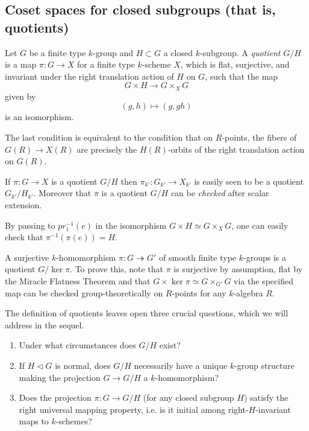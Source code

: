 \documentclass[10pt]{article}
\newcommand{\nsg}{\vartriangleleft}
\renewcommand{\(}{\left(}
\renewcommand{\)}{\right)}
\newcommand{\onto}{\twoheadrightarrow }
\newcommand{\dtimes}{\displaystyle\mathop{\times}}
\numberwithin{thm}{subsection}
\begin{document}
\subsection{Coset spaces for closed subgroups (that is, quotients)}
\begin{defn}
Let $G$ be a finite type $k$-group
and $H\subset G$ a closed $k$-subgroup.
A \textit{quotient} $G/H$ is a map
$\pi:G\to X$ for a finite type $k$-scheme $X$,
which is flat, surjective, and invariant under the right translation action of $H$ on $G$,
such that the map
\[G\times H\to G\dtimes_X G\]
given by
\[(g,h)\mapsto (g,gh)\]
is an isomorphism.
\end{defn}
\begin{rem}
The last condition is equivalent to the condition
that on $R$-points, the fibers of $G(R)\to X(R)$ are
precisely the $H(R)$-orbits of the right translation action
on $G(R)$.
\end{rem}
\begin{rem}
If $\pi:G\to X$ is a quotient $G/H$
then $\pi_{k'}:G_{k'}\to X_{k'}$ is easily seen to be a quotient $G_{k'}/H_{k'}$.
Moreover that $\pi$ is a quotient $G/H$ can be \textit{checked}
after scalar extension.
\end{rem}
\begin{rem}
By passing to $pr_1^{-1}(e)$ in the isomorphism $G\times H\simeq G\dtimes_X G$,
one can easily check
that $\pi^{-1}(\pi(e))=H$.
\end{rem}
\begin{ex}
A surjective $k$-homomorphism $\pi:G\onto G'$
of smooth finite type $k$-groups
is a quotient $G/\ker \pi$.
To prove this, note that $\pi$ is surjective by assumption,
flat by the Miracle Flatness Theorem \cite[23.1]{crt} 
and that $G\times \ker\pi\simeq G\dtimes_{G'} G$
via the specified map can be checked group-theoretically
on $R$-points for any $k$-algebra $R$.
\end{ex}
The definition of quotients leaves open three crucial questions, which we will address in the sequel.
\begin{enumerate}
\item Under what circumstances does $G/H$ exist?
\item If $H\nsg G$ is normal, does
$G/H$ necessarily have a unique $k$-group structure
making the projection $G\to G/H$ a $k$-homomorphism?
\item Does the projection $\pi:G\to G/H$ (for any closed subgroup $H$)
satisfy the right universal mapping property, i.e.
is it initial among right-$H$-invariant maps to $k$-schemes?
\end{enumerate}
\end{document}
